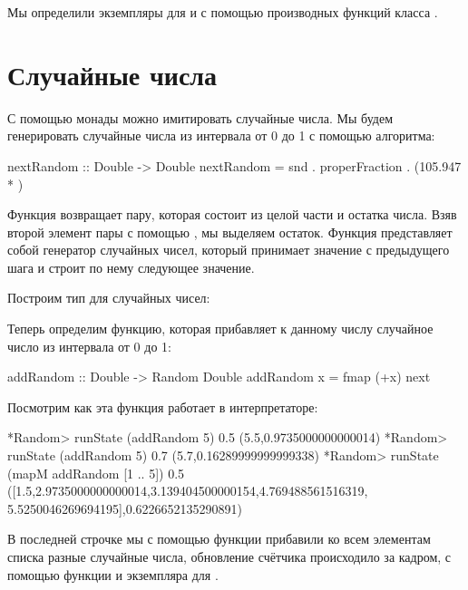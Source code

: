 Мы определили экземпляры для  и 
с помощью производных функций класса .

\section{Случайные числа}

С помощью монады  можно имитировать
    случайные числа. Мы будем генерировать случайные
    числа из интервала от 0 до 1 с помощью алгоритма:
    
\begin{code}
nextRandom :: Double -> Double
nextRandom = snd . properFraction . (105.947 * )
\end{code}

Функция  возвращает пару, которая 
состоит из целой части и остатка числа. Взяв второй элемент пары с помощью 
, мы выделяем остаток. 
Функция  представляет собой генератор
случайных чисел, который принимает значение с предыдущего шага
и строит по нему следующее значение.

Построим тип для случайных чисел:


Теперь определим функцию, которая прибавляет к
данному числу случайное число из интервала
от 0 до 1:

\begin{code}
addRandom :: Double -> Random Double
addRandom x = fmap (+x) next 
\end{code}

Посмотрим как эта функция работает в интерпретаторе:

\begin{code}
*Random> runState (addRandom 5) 0.5
(5.5,0.9735000000000014)
*Random> runState (addRandom 5) 0.7
(5.7,0.16289999999999338)
*Random> runState (mapM addRandom [1 .. 5]) 0.5
([1.5,2.9735000000000014,3.139404500000154,4.769488561516319,
 5.5250046269694195],0.6226652135290891)
\end{code}

В последней строчке мы с помощью функции  
прибавили ко всем элементам списка разные случайные
числа, обновление счётчика происходило за кадром,
с помощью функции  и экземпляра 
для .


